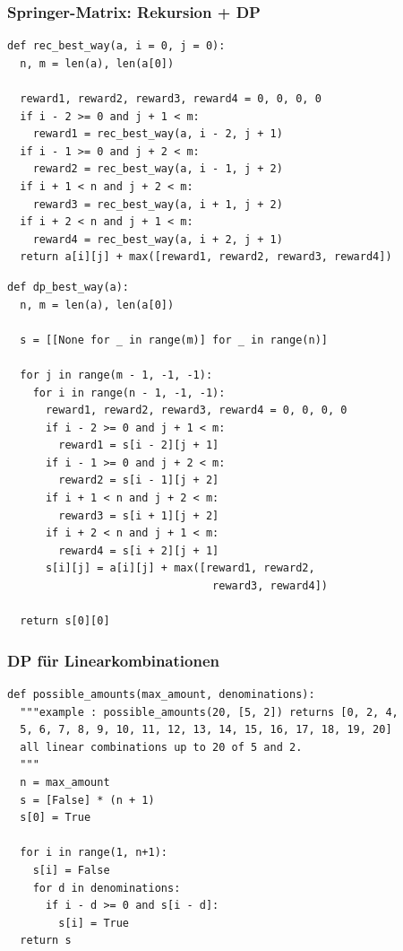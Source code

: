 \subsubsection{Springer-Matrix: Rekursion + DP}
\begin{codebox}
\begin{lstlisting}[style=CodeExpert]
def rec_best_way(a, i = 0, j = 0):
  n, m = len(a), len(a[0])

  reward1, reward2, reward3, reward4 = 0, 0, 0, 0
  if i - 2 >= 0 and j + 1 < m:
    reward1 = rec_best_way(a, i - 2, j + 1)
  if i - 1 >= 0 and j + 2 < m:
    reward2 = rec_best_way(a, i - 1, j + 2)
  if i + 1 < n and j + 2 < m:
    reward3 = rec_best_way(a, i + 1, j + 2)
  if i + 2 < n and j + 1 < m:
    reward4 = rec_best_way(a, i + 2, j + 1)
  return a[i][j] + max([reward1, reward2, reward3, reward4])
\end{lstlisting}
\end{codebox}
\begin{codebox}
\begin{lstlisting}[style=CodeExpert]
def dp_best_way(a):
  n, m = len(a), len(a[0])

  s = [[None for _ in range(m)] for _ in range(n)]

  for j in range(m - 1, -1, -1):
    for i in range(n - 1, -1, -1):
      reward1, reward2, reward3, reward4 = 0, 0, 0, 0
      if i - 2 >= 0 and j + 1 < m:
        reward1 = s[i - 2][j + 1]
      if i - 1 >= 0 and j + 2 < m:
        reward2 = s[i - 1][j + 2]
      if i + 1 < n and j + 2 < m:
        reward3 = s[i + 1][j + 2]
      if i + 2 < n and j + 1 < m:
        reward4 = s[i + 2][j + 1]
      s[i][j] = a[i][j] + max([reward1, reward2,
                                reward3, reward4])

  return s[0][0]
\end{lstlisting}
\end{codebox}


\subsubsection{DP für Linearkombinationen}

\begin{codebox}
    \begin{lstlisting}[style=CodeExpert]
def possible_amounts(max_amount, denominations):
  """example : possible_amounts(20, [5, 2]) returns [0, 2, 4,
  5, 6, 7, 8, 9, 10, 11, 12, 13, 14, 15, 16, 17, 18, 19, 20]
  all linear combinations up to 20 of 5 and 2.
  """
  n = max_amount
  s = [False] * (n + 1)
  s[0] = True

  for i in range(1, n+1):
    s[i] = False
    for d in denominations:
      if i - d >= 0 and s[i - d]:
        s[i] = True
  return s
\end{lstlisting}
\end{codebox}

